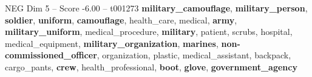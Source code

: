 \begin{textsample}{NEG Dim 5 – Score -6.00 – t001273}  \label{ex:f5_neg_026}
\textbf{military\_camouflage}, \textbf{military\_person}, \textbf{soldier}, \textbf{uniform}, \textbf{camouflage}, health\_care, medical, \textbf{army}, \textbf{military\_uniform}, medical\_procedure, \textbf{military}, patient, scrubs, hospital, medical\_equipment, \textbf{military\_organization}, \textbf{marines}, \textbf{non-commissioned\_officer}, organization, plastic, medical\_assistant, backpack, cargo\_pants, \textbf{crew}, health\_professional, \textbf{boot}, \textbf{glove}, \textbf{government\_agency}

\end{textsample}
